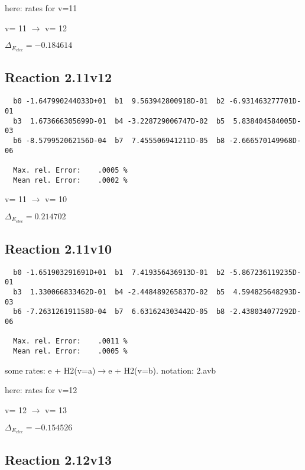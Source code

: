 \documentclass[12pt]{article}
\begin{document}
here: rates for v=11



  v=  11 $\rightarrow$ v= 12

$\Delta_{E_{elec}}=-0.184614$


\subsection{
Reaction 2.11v12
}


\begin{small}\begin{verbatim}
  b0 -1.647990244033D+01  b1  9.563942800918D-01  b2 -6.931463277701D-01
  b3  1.673666305699D-01  b4 -3.228729006747D-02  b5  5.838404584005D-03
  b6 -8.579952062156D-04  b7  7.455506941211D-05  b8 -2.666570149968D-06

  Max. rel. Error:    .0005 %
  Mean rel. Error:    .0002 %

\end{verbatim}\end{small}

  v=  11 $\rightarrow$ v= 10

$\Delta_{E_{elec}}= 0.214702$


\subsection{
Reaction 2.11v10
}


\begin{small}\begin{verbatim}
  b0 -1.651903291691D+01  b1  7.419356436913D-01  b2 -5.867236119235D-01
  b3  1.330066833462D-01  b4 -2.448489265837D-02  b5  4.594825648293D-03
  b6 -7.263126191158D-04  b7  6.631624303442D-05  b8 -2.438034077292D-06

  Max. rel. Error:    .0011 %
  Mean rel. Error:    .0005 %

\end{verbatim}\end{small}

\newpage
some rates: e + H2(v=a)$\rightarrow$e + H2(v=b). notation: 2.avb

here: rates for v=12


  v=  12 $\rightarrow$ v= 13

$\Delta_{E_{elec}}=-0.154526$


\subsection{
Reaction 2.12v13
}
\end{document}
